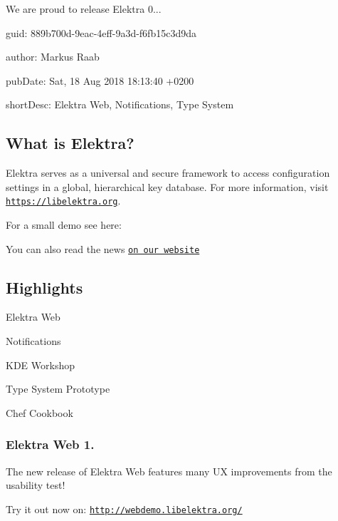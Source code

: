 We are proud to release Elektra 0...


\begin{DoxyItemize}
\item guid\+: 889b700d-\/9eac-\/4eff-\/9a3d-\/f6fb15c3d9da
\item author\+: Markus Raab
\item pub\+Date\+: Sat, 18 Aug 2018 18\+:13\+:40 +0200
\item short\+Desc\+: Elektra Web, Notifications, Type System
\end{DoxyItemize}

\subsection*{What is Elektra?}

Elektra serves as a universal and secure framework to access configuration settings in a global, hierarchical key database. For more information, visit \href{https://libelektra.org}{\tt https\+://libelektra.\+org}.

For a small demo see here\+:

\href{https://asciinema.org/a/cantr04assr4jkv8v34uz9b8r}{\tt }

You can also read the news \href{https://www.libelektra.org/news/0.8.24-release}{\tt on our website}

\subsection*{Highlights}


\begin{DoxyItemize}
\item Elektra Web
\item Notifications
\item K\+DE Workshop
\item Type System Prototype
\item Chef Cookbook
\end{DoxyItemize}

\subsubsection*{Elektra Web 1.}

The new release of Elektra Web features many UX improvements from the usability test!

\href{https://www.youtube.com/watch?v=lLg9sk6Hx-E}{\tt }

Try it out now on\+: \href{http://webdemo.libelektra.org/}{\tt http\+://webdemo.\+libelektra.\+org/}

